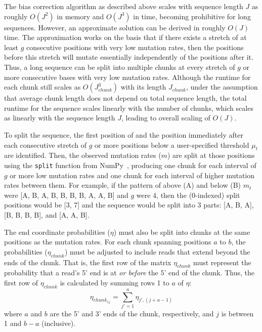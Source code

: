 \documentclass{article}
\begin{document}
The bias correction algorithm as described above scales with sequence length $J$ as roughly $O(J^2)$ in memory and $O(J^3)$ in time, becoming prohibitive for long sequences.
However, an approximate solution can be derived in roughly $O(J)$ time.
The approximation works on the basis that if there exists a stretch of at least $g$ consecutive positions with very low mutation rates, then the positions before this stretch will mutate essentially independently of the positions after it.
Thus, a long sequence can be split into multiple chunks at every stretch of $g$ or more consecutive bases with very low mutation rates.
Although the runtime for each chunk still scales as $O(J_{chunk}^3)$ with its length $J_{chunk}$, under the assumption that average chunk length does not depend on total sequence length, the total runtime for the sequence scales linearly with the number of chunks, which scales as linearly with the sequence length $J$, leading to overall scaling of $O(J)$.

To split the sequence, the first position of and the position immediately after each consecutive stretch of $g$ or more positions below a user-specified threshold $\mu_t$ are identified.
Then, the observed mutation rates ($m$) are split at those positions using the \verb|split| function from NumPy~\cite{Harris2020}, producing one chunk for each interval of $g$ or more low mutation rates and one chunk for each interval of higher mutation rates between them.
For example, if the pattern of above (A) and below (B) $m_t$ were [A, B, A, B, B, B, B, A, A, B] and $g$ were 4, then the (0-indexed) split positions would be [3, 7] and the sequence would be split into 3 parts: [A, B, A], [B, B, B, B], and [A, A, B].

The end coordinate probabilities ($\eta$) must also be split into chunks at the same positions as the mutation rates.
For each chunk spanning positions $a$ to $b$, the probabilities ($\eta_{chunk}$) must be adjusted to include reads that extend beyond the ends of the chunk.
That is, the first row of the matrix $\eta_{chunk}$ must represent the probability that a read's 5' end is at \textit{or before} the 5' end of the chunk.
Thus, the first row of $\eta_{chunk}$ is calculated by summing rows 1 to $a$ of $\eta$:
\begin{equation}
    \eta_{chunk_{1j}} = \sum_{j'=1}^a{\eta_{j',(j+a-1)}}
\end{equation}
where $a$ and $b$ are the 5' and 3' ends of the chunk, respectively, and $j$ is between 1 and $b-a$ (inclusive).
\end{document}
